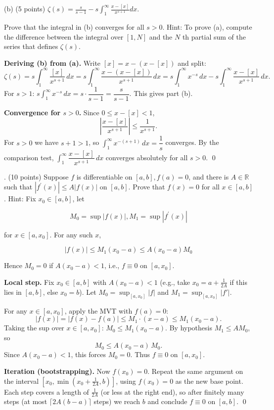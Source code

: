 \documentclass[10pt]{article}
\newenvironment{solution}{%
  \par\medskip\noindent{\color{red}\textbf{Solution.}}\color{red}\;}%
  {\par\medskip}
\begin{document}
(b) (5 points) $\zeta(s)=\frac{s}{s-1}-s \int_{1}^{\infty} \frac{x-[x]}{x^{s+1}} d x$.

Prove that the integral in (b) converges for all $s>0$. Hint: To prove (a), compute the difference between the integral over $[1, N]$ and the $N$ th partial sum of the series that defines $\zeta(s)$.

\begin{solution}
\textbf{Deriving (b) from (a).} Write $[x] = x - (x - [x])$ and split:
$$
\zeta(s) = s\int_1^\infty \frac{[x]}{x^{s+1}}\,dx = s\int_1^\infty \frac{x - (x-[x])}{x^{s+1}}\,dx = s\int_1^\infty x^{-s}\,dx - s\int_1^\infty \frac{x-[x]}{x^{s+1}}\,dx.
$$
For $s > 1$: $s\int_1^\infty x^{-s}\,dx = s\cdot\dfrac{1}{s-1} = \dfrac{s}{s-1}$. This gives part (b).

\textbf{Convergence for $s > 0$.} Since $0 \leq x - [x] < 1$,
$$
\left|\frac{x-[x]}{x^{s+1}}\right| \leq \frac{1}{x^{s+1}}.
$$
For $s > 0$ we have $s+1 > 1$, so $\int_1^\infty x^{-(s+1)}\,dx = \dfrac{1}{s}$ converges. By the comparison test, $\int_1^\infty \dfrac{x-[x]}{x^{s+1}}\,dx$ converges absolutely for all $s > 0$. \qed
\end{solution}

\clearpage
{}. (10 points) Suppose $f$ is differentiable on $[a, b], f(a)=0$, and there is $A \in \mathbb{R}$ such that $\left|f^{\prime}(x)\right| \leq A|f(x)|$ on $[a, b]$. Prove that $f(x)=0$ for all $x \in[a, b]$. Hint: Fix $x_{0} \in[a, b]$, let

$$
M_{0}=\sup |f(x)|, M_{1}=\sup \left|f^{\prime}(x)\right|
$$

for $x \in\left[a, x_{0}\right]$. For any such $x$,

$$
|f(x)| \leq M_{1}\left(x_{0}-a\right) \leq A\left(x_{0}-a\right) M_{0}
$$

Hence $M_0=0$ if $A\left(x_{0}-a\right)<1$, i.e., $f \equiv 0$ on $\left[a, x_{0}\right]$.

\begin{solution}
\textbf{Local step.} Fix $x_0 \in [a,b]$ with $A(x_0 - a) < 1$ (e.g., take $x_0 = a + \frac{1}{2A}$ if this lies in $[a,b]$, else $x_0 = b$). Let $M_0 = \sup_{[a,x_0]}|f|$ and $M_1 = \sup_{[a,x_0]}|f'|$.

For any $x \in [a, x_0]$, apply the MVT with $f(a) = 0$:
$$
|f(x)| = |f(x) - f(a)| \leq M_1 \cdot (x - a) \leq M_1(x_0 - a).
$$
Taking the sup over $x \in [a,x_0]$: $M_0 \leq M_1(x_0 - a)$. By hypothesis $M_1 \leq AM_0$, so
$$
M_0 \leq A(x_0 - a)\,M_0.
$$
Since $A(x_0 - a) < 1$, this forces $M_0 = 0$. Thus $f \equiv 0$ on $[a, x_0]$.

\textbf{Iteration (bootstrapping).} Now $f(x_0) = 0$. Repeat the same argument on the interval $[x_0, \min(x_0 + \frac{1}{2A}, b)]$, using $f(x_0) = 0$ as the new base point. Each step covers a length of $\frac{1}{2A}$ (or less at the right end), so after finitely many steps (at most $\lceil 2A(b-a) \rceil$ steps) we reach $b$ and conclude $f \equiv 0$ on $[a,b]$. \qed
\end{solution}
\clearpage
\end{document}
